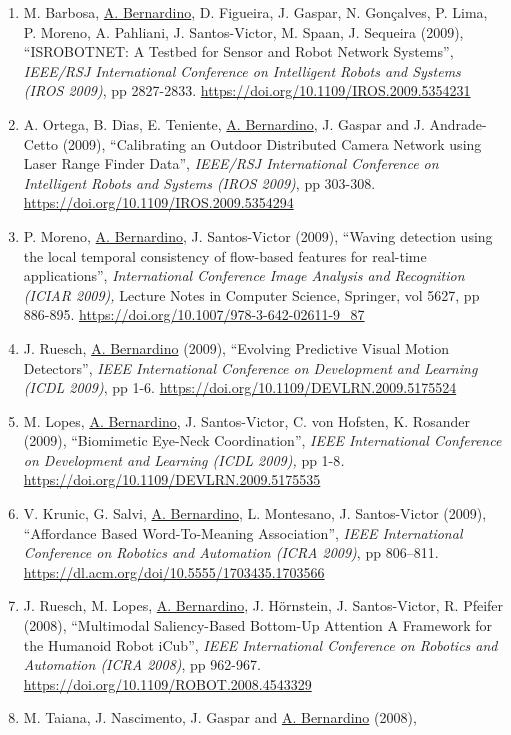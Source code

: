 \begin{enumerate}
\item
  M. Barbosa, \ul{A. Bernardino}, D. Figueira, J. Gaspar, N. Gonçalves,
  P. Lima, P. Moreno, A. Pahliani, J. Santos-Victor, M. Spaan, J.
  Sequeira (2009), ``ISROBOTNET: A Testbed for Sensor and Robot Network
  Systems'', \emph{IEEE/RSJ International Conference on Intelligent
  Robots and Systems (IROS 2009)}, pp 2827-2833.
  \url{https://doi.org/10.1109/IROS.2009.5354231}~
\item
  A. Ortega, B. Dias, E. Teniente, \ul{A. Bernardino}, J. Gaspar and J.
  Andrade-Cetto (2009), ``Calibrating an Outdoor Distributed Camera
  Network using Laser Range Finder Data'', \emph{IEEE/RSJ International
  Conference on Intelligent Robots and Systems (IROS 2009)}, pp 303-308.
  \url{https://doi.org/10.1109/IROS.2009.5354294}~
\item
  P. Moreno, \ul{A. Bernardino}, J. Santos-Victor (2009), ``Waving
  detection using the local temporal consistency of flow-based features
  for real-time applications'', \emph{International Conference Image
  Analysis and Recognition (ICIAR 2009),} Lecture Notes in Computer
  Science, Springer, vol 5627, pp 886-895.
  \url{https://doi.org/10.1007/978-3-642-02611-9_87}~
\item
  J. Ruesch, \ul{A. Bernardino} (2009), ``Evolving Predictive Visual
  Motion Detectors'', \emph{IEEE International Conference on Development
  and Learning (ICDL 2009)}, pp 1-6.
  \url{https://doi.org/10.1109/DEVLRN.2009.5175524}
\item
  M. Lopes, \ul{A. Bernardino}, J. Santos-Victor, C. von Hofsten, K.
  Rosander (2009), ``Biomimetic Eye-Neck Coordination'', \emph{IEEE
  International Conference on Development and Learning (ICDL 2009),} pp
  1-8\emph{.} \url{https://doi.org/10.1109/DEVLRN.2009.5175535} ~
\item
  V. Krunic, G. Salvi, \ul{A. Bernardino}, L. Montesano, J.
  Santos-Victor (2009), ``Affordance Based Word-To-Meaning
  Association'', \emph{IEEE International Conference on Robotics and
  Automation (ICRA 2009)}, pp 806--811.
  \url{https://dl.acm.org/doi/10.5555/1703435.1703566}~
\item
  J. Ruesch, M. Lopes, \ul{A. Bernardino}, J. Hörnstein, J.
  Santos-Victor, R. Pfeifer (2008), ``Multimodal Saliency-Based
  Bottom-Up Attention A Framework for the Humanoid Robot iCub'',
  \emph{IEEE International Conference on Robotics and Automation (ICRA
  2008)}, pp 962-967. \url{https://doi.org/10.1109/ROBOT.2008.4543329}~
\item
  M. Taiana, J. Nascimento, J. Gaspar and \ul{A. Bernardino} (2008),

\end{enumerate}
